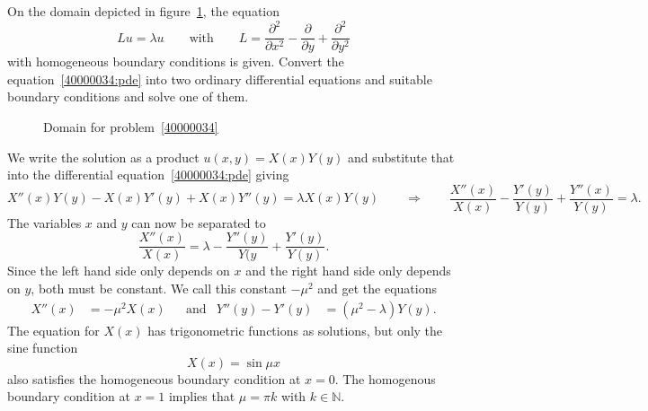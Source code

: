 On the domain depicted in figure~\ref{40000034:domain}, the equation
\begin{equation}
Lu=\lambda u
\qquad\text{with}\qquad
L
=
\frac{\partial^2}{\partial x^2}
-
\frac{\partial}{\partial y}
+
\frac{\partial^2}{\partial y^2}
\label{40000034:pde}
\end{equation}
with homogeneous boundary conditions is given.
Convert the equation~\eqref{40000034:pde} into two ordinary differential
equations and suitable boundary conditions and solve one of them.
\begin{figure}[ht]
\centering
{}
\caption{Domain for problem~\ref{40000034}
\label{40000034:domain}}
\end{figure}

\begin{loesung}
We write the solution as a product $u(x,y) = X(x)Y(y)$ and substitute
that into the differential equation~\eqref{40000034:pde} giving
\[
X''(x)Y(y) - X(x)Y'(y) + X(x)Y''(y) = \lambda X(x)Y(y)
\qquad\Rightarrow\qquad
\frac{X''(x)}{X(x)}
-
\frac{Y'(y)}{Y(y)}
+
\frac{Y''(x)}{Y(y)}
=
\lambda.
\]
The variables $x$ and $y$ can now be separated to
\[
\frac{X''(x)}{X(x)}
=
\lambda -\frac{Y''(y)}{Y(y} + \frac{Y'(y)}{Y(y)}.
\]
Since the left hand side only depends on $x$ and the right hand side
only depends on $y$, both must be constant.
We call this constant $-\mu^2$ and get the equations
\begin{align*}
X''(x)
&=
-\mu^2 X(x)
&&\text{and}&
Y''(y) - Y'(y) &= (\mu^2-\lambda)Y(y).
\end{align*}
The equation for $X(x)$ has trigonometric functions as solutions,
but only the sine function
\[
X(x) = \sin \mu x
\]
also satisfies the homogeneous boundary condition at $x=0$.
The homogenous boundary condition at $x=1$ implies that $\mu = \pi k$
with $k\in\mathbb{N}$.
\end{loesung}

